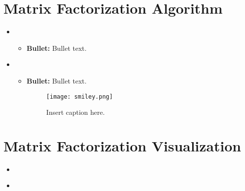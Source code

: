 \section{Matrix Factorization Algorithm}
\medskip
\begin{itemize}

    - What parameters did you adjust and how?
    - Justify your choices for the parameters and stopping criteria
    - Did you make any other significant modifications or additions

    \item {}
    \begin{itemize}
    \item \textbf{Bullet:} Bullet text.
    \end{itemize}

    \item {}
    \begin{itemize}
    \item \textbf{Bullet:} Bullet text.

    \begin{figure}[H]
    \centering
    \texttt{[image: smiley.png]}
    \caption{Insert caption here.}
    \end{figure}

    \end{itemize}

\end{itemize}



\section{Matrix Factorization Visualization}
\medskip
\begin{itemize}

    - What did you observe?
    - How do the ratings of the best movies compare to those of the most popular movies
    - How do the ratings of the three genres you chose compare to one another
    - What was expected and what was surprising from the visualizations?
    - Any other comparisons/observations

    \item {} \\

    \item {} \\

\end{itemize}



